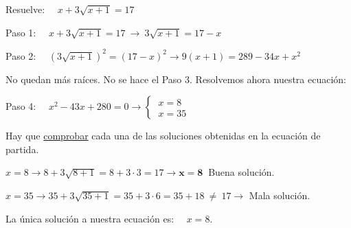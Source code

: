 \begin{miejemplo}

Resuelve: $\quad x+3\sqrt{x+1}=17$

\vspace{5mm} Paso 1: $\quad x+3\sqrt{x+1}=17 \ \to \ 3\sqrt{x+1}=17-x$

\vspace{2mm} Paso 2: $\quad \left( 3\sqrt{x+1}\right)^2=(17-x)^2 \to 9(x+1)=289-34x+x^2$

\vspace{2mm} No quedan más raíces. No se hace el Paso 3. Resolvemos ahora nuestra ecuación:

\vspace{2mm} Paso 4:  $\quad x^2-43x+280=0 \to \begin{cases} \ x=8 \\ \ x=35 \end{cases}$

\vspace{2mm} Hay que \underline{comprobar} cada una de las soluciones obtenidas en la ecuación de partida. 

\vspace{2mm} $x=8 \to  8+3\sqrt{8+1} = 8+3\cdot 3 = 17 \to \boldsymbol{x=8}\ $ Buena solución.

\vspace{2mm} $x=35 \to  35+3\sqrt{35+1}=35+3\cdot 6=35+18  \ \boldsymbol{\neq} \  17 \to $ Mala solución.

\vspace{2mm} La única solución a nuestra ecuación es: $\quad x=8$.
	
\end{miejemplo}


